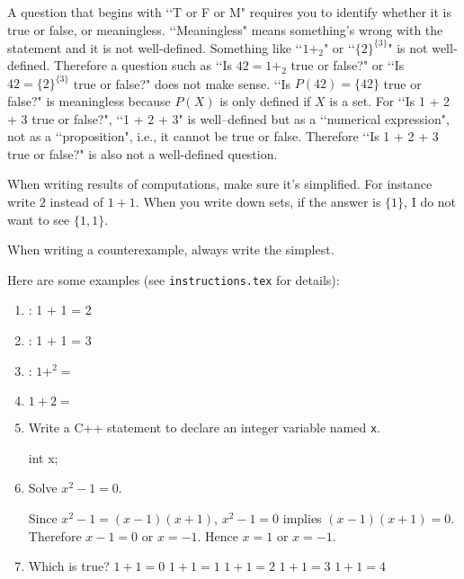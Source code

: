 A question that begins with \lq\lq T or F or M"
requires you to identify whether it is true or
false, or meaningless.
\lq\lq Meaningless" means something's wrong with the statement and
it is not well-defined.
Something like \lq\lq $1 +_2$" or \lq\lq $\{2\}^{\{3\}}$" is not
well-defined.
Therefore a question such as
\lq\lq Is $42 = 1 +_2$ true or false?" or
\lq\lq Is $42 = \{2\}^{\{3\}}$ true or false?"
does not make sense.
\lq\lq Is $P(42) = \{42\}$ true or false?" is meaningless because $P(X)$
is only defined if $X$ is a set.
For \lq\lq Is 1 + 2 + 3 true or false?", \lq\lq 1 + 2 + 3" is well--defined but
as a
\lq\lq numerical expression", not as a \lq\lq proposition", i.e.,
it cannot be true or false.
Therefore \lq\lq Is 1 + 2 + 3 true or false?" is also not a well-defined
question.

When writing results of computations, make sure it's simplified.
For instance write $2$ instead of $1 + 1$.
When you write down sets,
if the answer is $\{1\}$, I do not
want to see $\{1, 1\}$.

When writing a counterexample, always write the simplest.

Here are some examples (see \verb!instructions.tex! for details):

\begin{enumerate}

 \item \tf: 1 + 1 = 2 \dotfill{}
 
 \item \tf: 1 + 1 = 3 \dotfill{}
 
 \item \tf: $1 +^2 =$ \dotfill{}
 
 \item $1 + 2 =$ 
 
 \item Write a C++ statement to declare an integer variable named
 \verb!x!.
 \begin{answercode}
int x;
 \end{answercode}

 \item Solve $x^2 - 1 = 0$.
 \begin{answerlong}
 Since $x^2 - 1 = (x-1)(x+1)$, $x^2 - 1 = 0$ implies $(x-1)(x+1)=0$.
 Therefore $x - 1 = 0$ or $x = -1$.
 Hence $x = 1$ or $x = -1$.
 \end{answerlong}

 \item
 \begin{mcq}
 {Which is true?}{}
 {$1+1=0$}
 {$1+1=1$}
 {$1+1=2$}
 {$1+1=3$}
 {$1+1=4$}
 \end{mcq}


\end{enumerate}
